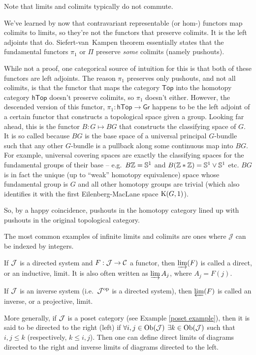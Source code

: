 Note that limits and colimits typically do not commute.

\begin{example}
    We've learned by now that contravariant representable (or hom-) functors map colimits to limits, so they're not the functors that preserve colimits. It is the left adjoints that do. Siefert-van~Kampen theorem essentially states that the fundamental functors $\pi_1$ or $\Pi$ preserve \emph{some} colimits (namely pushouts). 
    
    While not a proof, one categorical source of intuition for this is that both of these functors are left adjoints. The reason $\pi_1$ preserves only pushouts, and not all colimits, is that the functor that maps the category $\mathsf{Top}$ into the homotopy category $\mathsf{hTop}$ doesn't preserve colimits, so $\pi_1$ doesn't either. However, the descended version of this functor, $\pi_1:\mathsf{hTop}\to \mathsf{Gr}$ happens to be the left adjoint of a certain functor that constructs a topological space given a group. Looking far ahead, this is the functor $B:G\mapsto BG$ that constructs the classifying space of $G$. It is so called because $BG$ is the base space of a universal principal $G$-bundle such that any other $G$-bundle is a pullback along some continuous map into $BG$. For example, universal covering spaces are exactly the classifying spaces for the fundamental groups of their base -- e.g.\ $B\mathbb{Z}=\mathbb{S}^1$ and $B(\mathbb{Z}\ast \mathbb{Z})=\mathbb{S}^1\vee \mathbb{S}^1$ etc. $BG$ is in fact the unique (up to ``weak'' homotopy equivalence) space whose fundamental group is $G$ and all other homotopy groups are trivial (which also identifies it with the first  Eilenberg-MacLane space $\mathrm{K}(G,1)$).

    So, by a happy coincidence, pushouts in the homotopy category lined up with pushouts in the original topological category.
\end{example}

The most common examples of infinite limits and colimits are ones where $\mathcal{J}$ can be indexed by integers.

\begin{defn}
    If $\mathcal{J}$ is a directed system and $F:\mathcal{J}\to \mathcal{C}$ a functor, then $\varinjlim(F)$ is called a direct, or an inductive, limit. It is also often written as $\varinjlim A_j$, where $A_j=F(j)$.
    
    If $\mathcal{J}$ is an inverse system (i.e.~$\mathcal{J}^{\mathrm{op}}$ is a directed system), then $\varprojlim(F)$ is called an inverse, or a projective, limit.
    
    More generally, if $\mathcal{J}$ is a poset category (see Example \ref{poset example}), then it is said to be directed to the right (left) if $\forall i,j\in \operatorname{Ob}(\mathcal{J})$ $\exists k\in \operatorname{Ob}(\mathcal{J})$ such that $i,j\leq k$ (respectively, $k\leq i,j$). Then one can define direct limits of diagrams directed to the right and inverse limits of diagrams directed to the left.
\end{defn}


